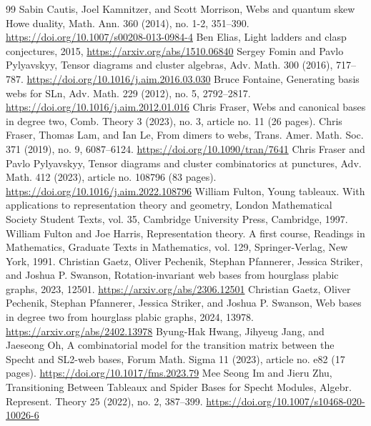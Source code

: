 \begin{thebibliography}{99}
 Sabin Cautis, Joel Kamnitzer, and Scott Morrison, Webs and quantum skew Howe duality, Math. Ann. 360 (2014), no. 1-2, 351–390. \url{https://doi.org/10.1007/s00208-013-0984-4}
 Ben Elias, Light ladders and clasp conjectures, 2015, \url{https://arxiv.org/abs/1510.06840}
 Sergey Fomin and Pavlo Pylyavskyy, Tensor diagrams and cluster algebras, Adv. Math. 300 (2016), 717–787. \url{https://doi.org/10.1016/j.aim.2016.03.030}
 Bruce Fontaine, Generating basis webs for SLn, Adv. Math. 229 (2012), no. 5, 2792–2817. \url{https://doi.org/10.1016/j.aim.2012.01.016}
 Chris Fraser, Webs and canonical bases in degree two, Comb. Theory 3 (2023), no. 3, article no. 11 (26 pages). 
 Chris Fraser, Thomas Lam, and Ian Le, From dimers to webs, Trans. Amer. Math. Soc. 371 (2019), no. 9, 6087–6124. \url{https://doi.org/10.1090/tran/7641}
 Chris Fraser and Pavlo Pylyavskyy, Tensor diagrams and cluster combinatorics at punctures, Adv. Math. 412 (2023), article no. 108796 (83 pages). \url{https://doi.org/10.1016/j.aim.2022.108796}
 William Fulton, Young tableaux. With applications to representation theory and geometry, London Mathematical Society Student Texts, vol. 35, Cambridge University Press, Cambridge, 1997. 
 William Fulton and Joe Harris, Representation theory. A first course, Readings in Mathematics, Graduate Texts in Mathematics, vol. 129, Springer-Verlag, New York, 1991. 
 Christian Gaetz, Oliver Pechenik, Stephan Pfannerer, Jessica Striker, and Joshua P. Swanson, Rotation-invariant web bases from hourglass plabic graphs, 2023,  12501. \url{https://arxiv.org/abs/2306.12501}
 Christian Gaetz, Oliver Pechenik, Stephan Pfannerer, Jessica Striker, and Joshua P. Swanson, Web bases in degree two from hourglass plabic graphs, 2024,  13978. \url{https://arxiv.org/abs/2402.13978}
 Byung-Hak Hwang, Jihyeug Jang, and Jaeseong Oh, A combinatorial model for the transition matrix between the Specht and SL2-web bases, Forum Math. Sigma 11 (2023), article no. e82 (17 pages). \url{https://doi.org/10.1017/fms.2023.79}
 Mee Seong Im and Jieru Zhu, Transitioning Between Tableaux and Spider Bases for Specht Modules, Algebr. Represent. Theory 25 (2022), no. 2, 387–399. \url{https://doi.org/10.1007/s10468-020-10026-6}

\end{thebibliography}
